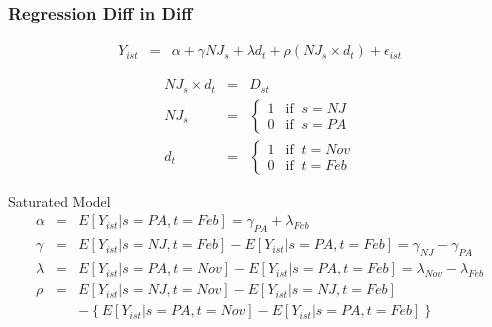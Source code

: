 \documentclass[notes=show,beamer,compress]{beamer}
\begin{document}

\begin{frame}
\frametitle{Regression Diff in Diff}

 \begin{eqnarray*}
Y_{ist}&=& \alpha + \gamma NJ_{s}+ \lambda d_{t}+ \rho ( NJ_{s}\times d_{t})+ \epsilon_{ist}
 \end{eqnarray*}

 \begin{eqnarray*}
NJ_{s} \times d_{t}&=& D_{st} \\
NJ_{s}&=& \left\{ \begin{array}{cc}
                                                1 & \text{if}\;\; s=NJ \\
                                                0 & \text{if}\;\; s=PA
                            \end{array} \right. \\
d_{t}&=& \left\{ \begin{array}{cc}
                                                1 & \text{if}\;\; t=Nov \\
                                                0 & \text{if}\;\; t=Feb
                            \end{array} \right.
 \end{eqnarray*}

Saturated Model
\begin{eqnarray*}
\alpha&=& E[Y_{ist}| s= PA, t= Feb] = \gamma_{PA} + \lambda_{Feb}\\
\gamma&=& E[Y_{ist}| s= NJ, t= Feb]-E[Y_{ist}| s= PA, t= Feb] =\gamma_{NJ} - \gamma_{PA} \\
\lambda&=& E[Y_{ist}| s= PA, t= Nov]-E[Y_{ist}| s= PA, t= Feb] =\lambda_{Nov} - \lambda_{Feb}\\
\rho &=& E[Y_{ist}| s= NJ, t= Nov]-  E[Y_{ist}| s= NJ, t= Feb] \\
&&- \left\{E[Y_{ist}| s= PA, t= Nov]- E[Y_{ist}| s= PA, t= Feb]\right\}
\end{eqnarray*}


\end{frame}









\end{document}
